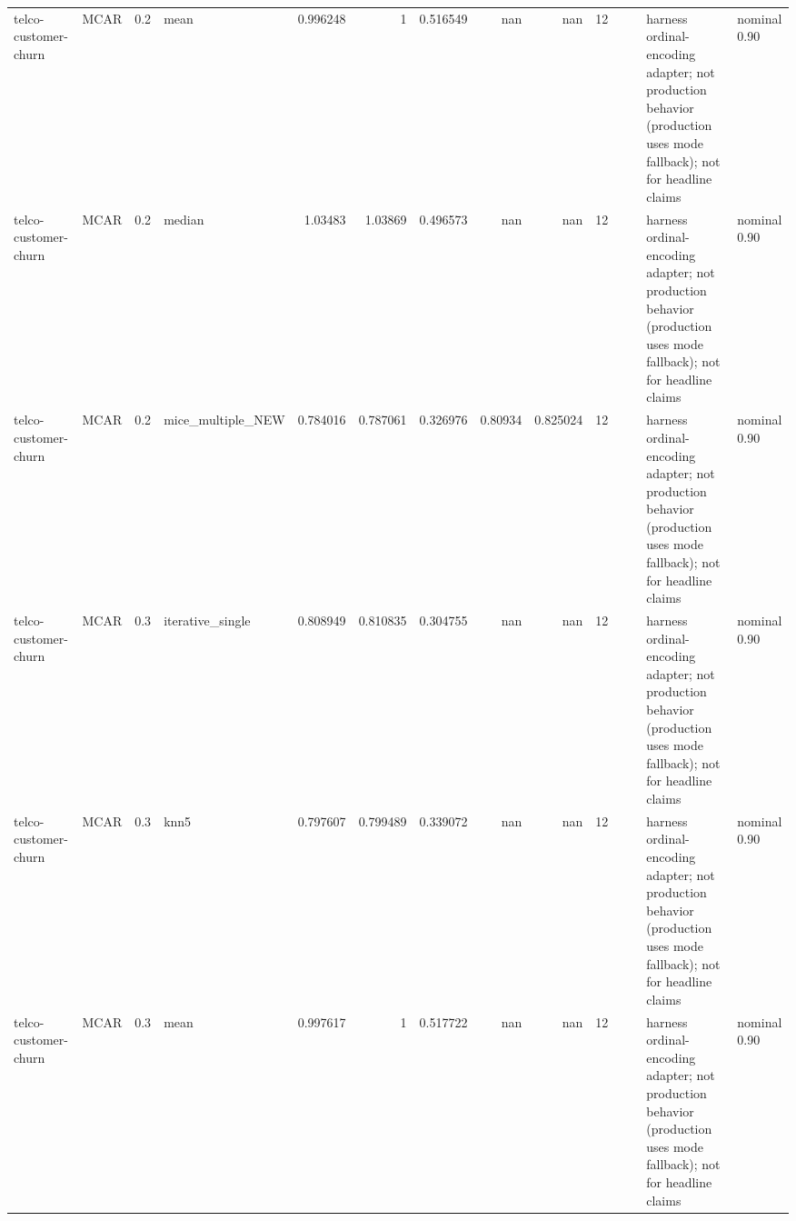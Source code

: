 \begin{table}[ht]
\begin{tabular}{llrlrrrrrrllll}
 telco-customer-churn & MCAR        &         0.2 & mean              &       0.996248 &             1        &                 0.516549 &                     nan        &                       nan        &        12 &                    &                                         & harness ordinal-encoding adapter; not production behavior (production uses mode fallback); not for headline claims & nominal 0.90              \\
 telco-customer-churn & MCAR        &         0.2 & median            &       1.03483  &             1.03869  &                 0.496573 &                     nan        &                       nan        &        12 &                    &                                         & harness ordinal-encoding adapter; not production behavior (production uses mode fallback); not for headline claims & nominal 0.90              \\
 telco-customer-churn & MCAR        &         0.2 & mice\_multiple\_NEW &       0.784016 &             0.787061 &                 0.326976 &                       0.80934  &                         0.825024 &        12 &                    &                                         & harness ordinal-encoding adapter; not production behavior (production uses mode fallback); not for headline claims & nominal 0.90              \\
 telco-customer-churn & MCAR        &         0.3 & iterative\_single  &       0.808949 &             0.810835 &                 0.304755 &                     nan        &                       nan        &        12 &                    &                                         & harness ordinal-encoding adapter; not production behavior (production uses mode fallback); not for headline claims & nominal 0.90              \\
 telco-customer-churn & MCAR        &         0.3 & knn5              &       0.797607 &             0.799489 &                 0.339072 &                     nan        &                       nan        &        12 &                    &                                         & harness ordinal-encoding adapter; not production behavior (production uses mode fallback); not for headline claims & nominal 0.90              \\
 telco-customer-churn & MCAR        &         0.3 & mean              &       0.997617 &             1        &                 0.517722 &                     nan        &                       nan        &        12 &                    &                                         & harness ordinal-encoding adapter; not production behavior (production uses mode fallback); not for headline claims & nominal 0.90              \\

\end{tabular}
\end{table}
